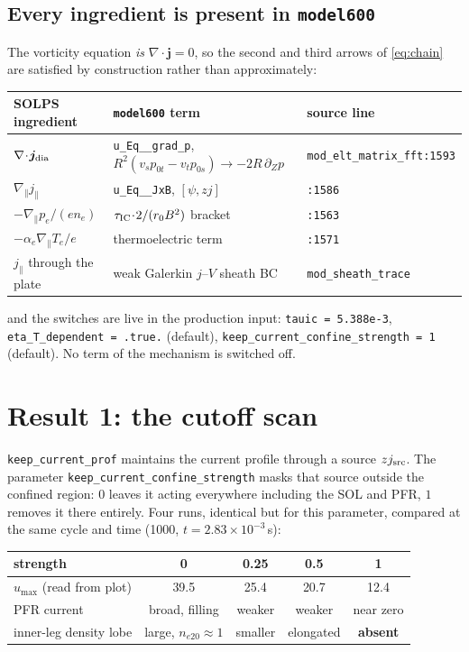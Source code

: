 \documentclass[11pt,a4paper]{article}
\newcommand{\code}[1]{\texttt{\small #1}}
\newcommand{\jpar}{j_\parallel}
\begin{document}
\subsection{Every ingredient is present in \code{model600}}

The vorticity equation \emph{is} $\nabla\!\cdot\!\bm j = 0$, so the second and third arrows of
\eqref{eq:chain} are satisfied by construction rather than approximately:

\begin{center}
\begin{tabular}{lll}
\toprule
SOLPS ingredient & \code{model600} term & source line \\
\midrule
$\nabla\!\cdot\!\bm j_{\rm dia}$ & \code{u\_Eq\_\_grad\_p}, $R^2(v_s p_{0t}-v_t p_{0s}) \to -2R\,\partial_Z p$ & \code{mod\_elt\_matrix\_fft:1593} \\
$\nabla_\parallel \jpar$         & \code{u\_Eq\_\_JxB}, $[\psi,zj]$                    & \code{:1586} \\
$-\nabla_\parallel p_e/(en_e)$   & $\tau_{\rm IC}\!\cdot\!2/(r_{0}B^2)$ bracket        & \code{:1563} \\
$-\alpha_e\nabla_\parallel T_e/e$& thermoelectric term                                 & \code{:1571} \\
$\jpar$ through the plate        & weak Galerkin $j$--$V$ sheath BC                     & \code{mod\_sheath\_trace} \\
\bottomrule
\end{tabular}
\end{center}

\noindent and the switches are live in the production input: \code{tauic = 5.388e-3},
\code{eta\_T\_dependent = .true.} (default), \code{keep\_current\_confine\_strength = 1}
(default). No term of the mechanism is switched off.

\section{Result 1: the cutoff scan}

\code{keep\_current\_prof} maintains the current profile through a source $zj_{\rm src}$.
The parameter \code{keep\_current\_confine\_strength} masks that source outside the confined
region: $0$ leaves it acting everywhere including the SOL and PFR, $1$ removes it there
entirely. Four runs, identical but for this parameter, compared at the same cycle and time
(1000, $t = 2.83\times10^{-3}$\,s):

\begin{center}
\begin{tabular}{lcccc}
\toprule
strength & 0 & 0.25 & 0.5 & 1 \\
\midrule
$u_{\max}$ (read from plot)   & 39.5 & 25.4 & 20.7 & 12.4 \\
PFR current                   & broad, filling & weaker & weaker & near zero \\
inner-leg density lobe        & large, $n_{e20}\!\approx\!1$ & smaller & elongated & \textbf{absent} \\
\bottomrule
\end{tabular}
\end{center}
\end{document}
